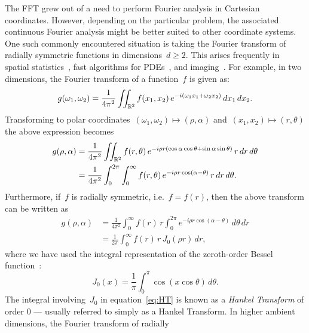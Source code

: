 The FFT grew out of a need to perform Fourier analysis in Cartesian coordinates.
However, depending on the particular problem, the associated continuous Fourier
analysis might be better suited to other coordinate systems. One such commonly
encountered situation is taking the Fourier transform of radially symmetric
functions in dimensions~$ d \geq 2$. This arises frequently in spatial
statistics~\cite{}, fast algorithms for PDEs~\cite{}, and imaging~\cite{}. For
example, in two dimensions, the Fourier transform of a function~$f$ is given as:
\begin{equation}
  g(\omega_1, \omega_2) = \frac{1}{4\pi^2} \iint_{\mathbb{R}^2} f(x_1, x_2) \, 
  e^{-i(\omega_1 x_1 + \omega_2 x_2)}  \, dx_1 \, dx_2.
\end{equation}
Transforming to polar coordinates~$(\omega_1,\omega_2) \mapsto (\rho,\alpha)$
and~$(x_1,x_2) \mapsto (r,\theta)$ the above expression becomes
\begin{equation}
  \label{eq:ftpolar}
  \begin{aligned}
    g(\rho, \alpha) &= \frac{1}{4\pi^2} \iint_{\R^2} 
    f(r,\theta) \, 
    e^{-i \rho r (\cos\alpha \cos\theta + \sin\alpha \sin\theta) } 
    \, r \, dr \, d\theta \\
  &= \frac{1}{4\pi^2} \int_0^{2\pi} \int_0^\infty f(r,\theta) \, e^{-i \rho r \cos(\alpha-\theta) } \, r \, dr \, d\theta.
  \end{aligned}
\end{equation}
Furthermore, if~$f$ is radially symmetric, i.e.~$f = f(r)$, then the above
transform can be written as
\begin{equation}
  \label{eq:HT}
  \begin{aligned}
  g(\rho,\alpha) &= \frac{1}{4\pi^2} \int_0^\infty f(r) \, r \int_0^{2\pi} 
  e^{-i \rho r \cos(\alpha - \theta) }  \, d\theta \, dr \\
  &= \frac{1}{2\pi} \int_0^\infty f(r) \, r \, J_0(\rho r)  \, dr,
  \end{aligned}
\end{equation}
where we have used the integral representation of the zeroth-order Bessel
function~\cite{olver2010nist}:
\begin{equation}
  J_0(x) 
  = \frac{1}{\pi} \int_0^\pi \cos \left( x \cos \theta \right) \, d\theta.
\end{equation}
The integral involving~$J_0$ in equation~\eqref{eq:HT} is known as a
\emph{Hankel Transform} of order 0 --- usually referred to simply as a Hankel
Transform. In higher ambient dimensions, the Fourier transform of radially
